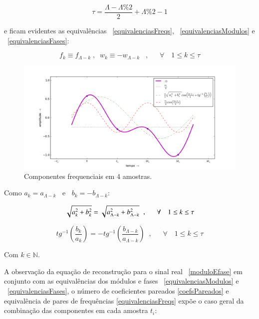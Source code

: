 \begin{equation}\label{coefsPareados}
\tau = \frac{\Lambda - \Lambda \% 2}{2} +\Lambda \% 2 -1
\end{equation}

e ficam evidentes as equivalências ~\ref{equivalenciasFreqs}, ~\ref{equivalenciasModulos} e ~\ref{equivalenciasFases}:

\begin{equation}\label{equivalenciasFreqs}
f_{k}\equiv f_{\Lambda-k}\;, \;\; w_{k}\equiv-w_{\Lambda-k}\;\;\;, \quad \;\; \forall \quad 1 \leq k \leq \tau  
\end{equation}

\begin{figure}[h!]
    \centering
        \includegraphics[width=\textwidth]{figuras/amostras4__}
    \caption{Componentes frequenciais em 4 amostras.}
        \label{fig:amostras4}
\end{figure}


Como $a_k = a_{\Lambda -k}\;\;$ e $\;\;b_k = - b_{\Lambda -k}$:

\begin{equation}\label{equivalenciasModulos}
\sqrt{a_k^2 + b_k^2} = \sqrt{a_{\Lambda - k}^2 + b_{\Lambda -k}^2} \;\;, \quad \;\; \forall \quad 1 \leq k \leq \tau  \\
\end{equation}

\begin{equation}\label{equivalenciasFases}
tg^{-1}\left(\frac{b_k}{a_k}\right)=-tg^{-1}\left(\frac{b_{\Lambda -k}}{a_{\Lambda - k}}\right)\;\;,\quad \;\; \forall \quad 1 \leq k \leq \tau
\end{equation}



Com $k \in \mathbb{N}$.

 A observação da equação de reconstrução para o sinal real ~\ref{moduloEfase} em conjunto com as equivalências dos módulos e fases ~\ref{equivalenciasModulos} e ~\ref{equivalenciasFases}, o número de coeficientes pareados \ref{coefsPareados} e equivalência de pares de frequências \ref{equivalenciasFreqs}
expõe o caso geral da combinação das componentes em cada amostra $t_i$:

